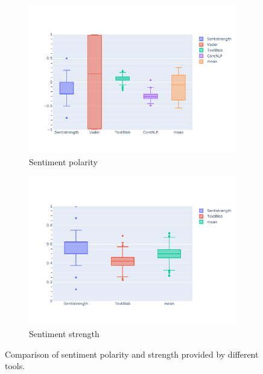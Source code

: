 \begin{figure}[!htbp]
     \centering
     \begin{subfigure}[b]{\textwidth}
         \centering
         \includegraphics[trim={0 1.5cm 0 2cm},clip,width=\textwidth]{figures/sentiment_polarity_comparison.pdf}
         \caption{Sentiment polarity}
         \label{fig:sentiment_polarity_comparison}
     \end{subfigure}
     \begin{subfigure}[b]{\textwidth}
         \centering
         \includegraphics[trim={0 1.5cm 0 2cm},clip,width=\textwidth]{figures/sentiment_strength_comparison.pdf}
         \caption{Sentiment strength}
         \label{fig:sentiment_strength_comparison}
     \end{subfigure}
        \caption{Comparison of sentiment polarity and strength provided by different tools.}
        \label{fig:sentiment_axes_comparison}
\end{figure}

